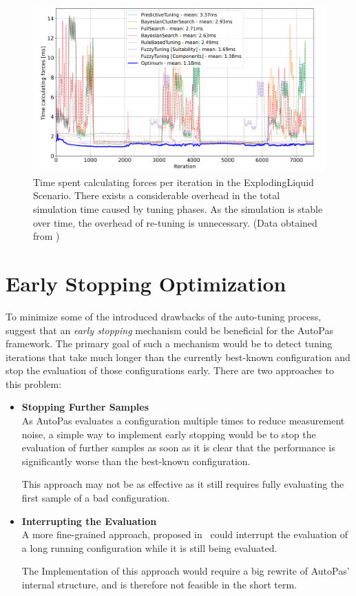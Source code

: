 \documentclass[conference]{IEEEtran}
\begin{document}
\begin{figure}[h]
    \centering
    \includegraphics[width=\columnwidth]{figures/unnecessary-tuning-phases.png}
    \caption{
        Time spent calculating forces per iteration in the ExplodingLiquid Scenario. There exists a considerable overhead in the total simulation time caused by tuning phases. As the simulation is stable over time, the overhead of re-tuning is unnecessary. (Data obtained from \cite{lerchner2024})
    }
    \label{fig:unnecessary-tuning-phases}
\end{figure}

\newpage

\section{Early Stopping Optimization}

To minimize some of the introduced drawbacks of the auto-tuning process, \cite{endreport.pdf}\cite{Manuel_Lerchner_Thesis.pdf}\cite{autopas_issue673} suggest that an \textit{early stopping} mechanism could be beneficial for the AutoPas framework. The primary goal of such a mechanism would be to detect tuning iterations that take much longer than the currently best-known configuration and stop the evaluation of those configurations early. There are two approaches to this problem:


\begin{itemize}
    \item \textbf{Stopping Further Samples}\\
          As AutoPas evaluates a configuration multiple times to reduce measurement noise, a simple way to implement early stopping would be to stop the evaluation of further samples as soon as it is clear that the performance is significantly worse than the best-known configuration.

          This approach may not be as effective as it still requires fully evaluating the first sample of a bad configuration.
    \item \textbf{Interrupting the Evaluation}\\
          A more fine-grained approach, proposed in~\cite{endreport.pdf} could interrupt the evaluation of a long running configuration while it is still being evaluated.

          The Implementation of this approach would require a big rewrite of AutoPas' internal structure, and is therefore not feasible in the short term.
\end{itemize}
\end{document}

